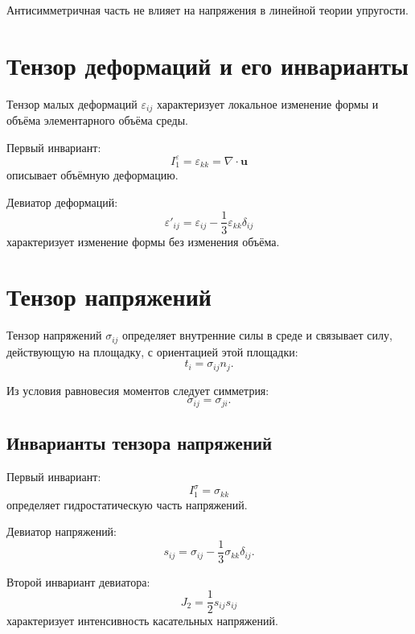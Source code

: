 Антисимметричная часть не влияет на напряжения
в линейной теории упругости.

\section{Тензор деформаций и его инварианты}

Тензор малых деформаций $\varepsilon_{ij}$
характеризует локальное изменение формы и объёма
элементарного объёма среды.

Первый инвариант:
\begin{equation}
I_1^\varepsilon = \varepsilon_{kk} = \nabla \cdot \mathbf{u}
\end{equation}
описывает объёмную деформацию.

Девиатор деформаций:
\begin{equation}
\varepsilon'_{ij}
=
\varepsilon_{ij}
-
\frac{1}{3} \varepsilon_{kk} \delta_{ij}
\end{equation}
характеризует изменение формы без изменения объёма.

\section{Тензор напряжений}

Тензор напряжений $\sigma_{ij}$
определяет внутренние силы в среде
и связывает силу, действующую на площадку,
с ориентацией этой площадки:
\begin{equation}
t_i = \sigma_{ij} n_j.
\end{equation}

Из условия равновесия моментов следует симметрия:
\begin{equation}
\sigma_{ij} = \sigma_{ji}.
\end{equation}

\subsection{Инварианты тензора напряжений}

Первый инвариант:
\begin{equation}
I_1^\sigma = \sigma_{kk}
\end{equation}
определяет гидростатическую часть напряжений.

Девиатор напряжений:
\begin{equation}
s_{ij}
=
\sigma_{ij}
-
\frac{1}{3} \sigma_{kk} \delta_{ij}.
\end{equation}

Второй инвариант девиатора:
\begin{equation}
J_2 = \frac{1}{2} s_{ij} s_{ij}
\end{equation}
характеризует интенсивность касательных напряжений.

